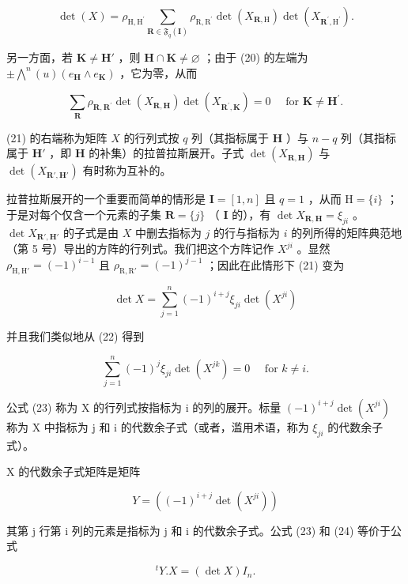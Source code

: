 \[
\det (X) = \rho_ {\mathrm{H}, \mathrm{H} ^ {\prime}} \sum_ {\mathbf {R} \in \mathfrak {F} _ {q} (\mathbf {I})} \rho_ {\mathrm{R}, \mathrm{R} ^ {\prime}} \det (X _ {\mathbf {R}, \mathrm{H}}) \det (X _ {\mathbf {R} ^ {\prime}, \mathrm{H} ^ {\prime}}).\tag{21}
\]

另一方面，若 \(\mathbf{K} \neq \mathbf{H}'\) ，则 \(\mathbf{H} \cap \mathbf{K} \neq \varnothing\) ；由于 (20) 的左端为 \(\pm \bigwedge^{n}(u)(e_{\mathbf{H}} \wedge e_{\mathbf{K}})\) ，它为零，从而

\[
\sum_ {\mathbf {R}} \rho_ {\mathbf {R}, \mathbf {R} ^ {\prime}} \det (X _ {\mathbf {R}, \mathbf {H}}) \det (X _ {\mathbf {R} ^ {\prime}, \mathbf {K}}) = 0 \quad \text { for } \mathbf {K} \neq \mathbf {H} ^ {\prime}.\tag{22}
\]

(21) 的右端称为矩阵 \(X\) 的行列式按 \(q\) 列（其指标属于 \(\mathbf{H}\) ）与 \(n - q\) 列（其指标属于 \(\mathbf{H}'\) ，即 \(\mathbf{H}\) 的补集）的拉普拉斯展开。子式 \(\det(X_{\mathbf{R},\mathbf{H}})\) 与 \(\det(X_{\mathbf{R}',\mathbf{H}'})\) 有时称为互补的。

拉普拉斯展开的一个重要而简单的情形是 \(\mathbf{I} = [1, n]\) 且 \(q = 1\) ，从而 \(\mathrm{H} = \{i\}\) ；于是对每个仅含一个元素的子集 \(\mathbf{R} = \{j\}\) （ \(\mathbf{I}\) 的），有 \(\det X_{\mathbf{R},\mathbf{H}} = \xi_{ji}\) 。 \(\det X_{\mathbf{R}',\mathbf{H}'}\) 的子式是由 \(X\) 中删去指标为 \(j\) 的行与指标为 \(i\) 的列所得的矩阵典范地（第 5 号）导出的方阵的行列式。我们把这个方阵记作 \(X^{ji}\) 。显然 \(\rho_{\mathrm{H},\mathrm{H}'} = (-1)^{i-1}\) 且 \(\rho_{\mathrm{R},\mathrm{R}'} = (-1)^{j-1}\) ；因此在此情形下 (21) 变为

\[
\det X = \sum_ {j = 1} ^ {n} (- 1) ^ {i + j} \xi_ {j i} \det (X ^ {j i})\tag{23}
\]

并且我们类似地从 (22) 得到

\[
\sum_ {j = 1} ^ {n} (- 1) ^ {j} \xi_ {j i} \det (X ^ {j k}) = 0 \quad \text { for } k \neq i.\tag{24}
\]

公式 (23) 称为 X 的行列式按指标为 i 的列的展开。标量 \((-1)^{i+j}\det(X^{ji})\) 称为 X 中指标为 j 和 i 的代数余子式（或者，滥用术语，称为 \(\xi_{ji}\) 的代数余子式）。

X 的代数余子式矩阵是矩阵

\[
Y = ((- 1) ^ {i + j} \det (X ^ {j i}))\tag{25}
\]

其第 j 行第 i 列的元素是指标为 j 和 i 的代数余子式。公式 (23) 和 (24) 等价于公式

\[
{ } ^ { t } Y . X = ( \operatorname * { d e t } X ) I _ { n } .\tag{26}
\]

